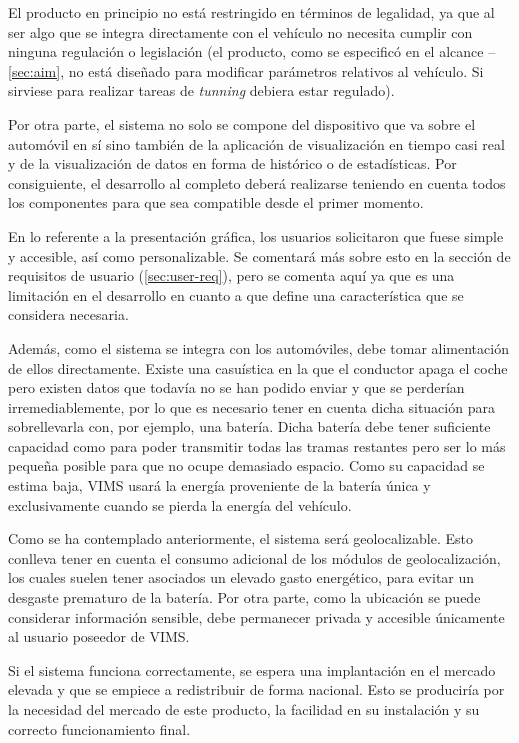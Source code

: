 El producto en principio no está restringido en términos de legalidad, ya que al
ser algo que se integra directamente con el vehículo no necesita cumplir con
ninguna regulación o legislación (el producto, como se especificó en el alcance
-- \ref{sec:aim}, no está diseñado para modificar parámetros relativos al
vehículo. Si sirviese para realizar tareas de \textit{tunning} debiera estar
regulado).

Por otra parte, el sistema no solo se compone del dispositivo que va sobre el
automóvil en sí sino también de la aplicación de visualización en tiempo casi
real y de la visualización de datos en forma de histórico o de estadísticas. Por
consiguiente, el desarrollo al completo deberá realizarse teniendo en cuenta
todos los componentes para que sea compatible desde el primer momento.

En lo referente a la presentación gráfica, los usuarios solicitaron que fuese
simple y accesible, así como personalizable. Se comentará más sobre esto en la
sección de requisitos de usuario (\ref{sec:user-req}), pero se comenta aquí ya
que es una limitación en el desarrollo en cuanto a que define una característica
que se considera necesaria.

Además, como el sistema se integra con los automóviles, debe tomar alimentación de
ellos directamente. Existe una casuística en la que el conductor apaga el
coche pero existen datos que todavía no se han podido enviar y que se
perderían irremediablemente, por lo que es necesario tener en cuenta dicha
situación para sobrellevarla con, por ejemplo, una batería. Dicha batería
debe tener suficiente capacidad como para poder transmitir todas las tramas
restantes pero ser lo más pequeña posible para que no ocupe demasiado espacio.
Como su capacidad se estima baja,
\ac{VIMS} usará la energía proveniente de la batería única y exclusivamente
cuando se pierda la energía del vehículo.

Como se ha contemplado anteriormente, el sistema será geolocalizable. Esto
conlleva tener en cuenta el consumo adicional de los módulos de geolocalización,
los cuales suelen tener asociados un elevado gasto energético, para evitar
un desgaste prematuro de la batería. Por otra parte, como la ubicación se puede 
considerar información sensible, debe permanecer privada y accesible únicamente 
al usuario poseedor de \ac{VIMS}.

Si el sistema funciona correctamente, se espera una implantación en el mercado
elevada y que se empiece a redistribuir de forma nacional. Esto se produciría
por la necesidad del mercado de este producto, la facilidad en su instalación y
su correcto funcionamiento final.